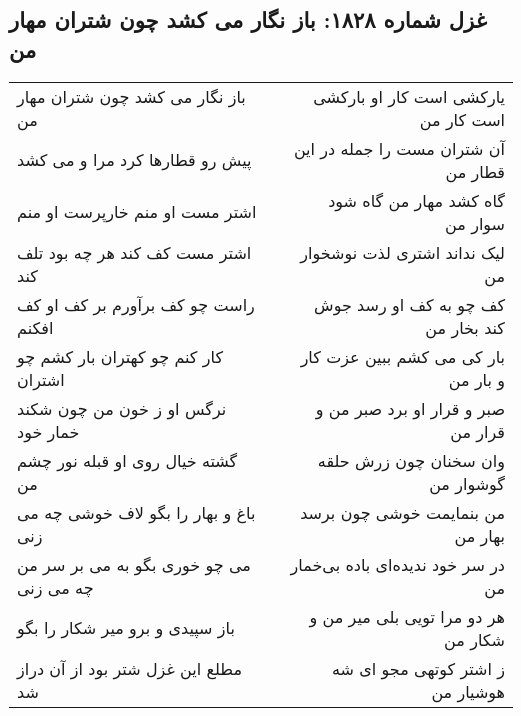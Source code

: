\begin{center}
\section*{غزل شماره ۱۸۲۸: باز نگار می کشد چون شتران مهار من}
\label{sec:1828}
\begin{longtable}{l p{0.5cm} r}
باز نگار می کشد چون شتران مهار من
&&
یارکشی است کار او بارکشی است کار من
\\
پیش رو قطارها کرد مرا و می کشد
&&
آن شتران مست را جمله در این قطار من
\\
اشتر مست او منم خارپرست او منم
&&
گاه کشد مهار من گاه شود سوار من
\\
اشتر مست کف کند هر چه بود تلف کند
&&
لیک نداند اشتری لذت نوشخوار من
\\
راست چو کف برآورم بر کف او کف افکنم
&&
کف چو به کف او رسد جوش کند بخار من
\\
کار کنم چو کهتران بار کشم چو اشتران
&&
بار کی می کشم ببین عزت کار و بار من
\\
نرگس او ز خون من چون شکند خمار خود
&&
صبر و قرار او برد صبر من و قرار من
\\
گشته خیال روی او قبله نور چشم من
&&
وان سخنان چون زرش حلقه گوشوار من
\\
باغ و بهار را بگو لاف خوشی چه می زنی
&&
من بنمایمت خوشی چون برسد بهار من
\\
می چو خوری بگو به می بر سر من چه می زنی
&&
در سر خود ندیده‌ای باده بی‌خمار من
\\
باز سپیدی و برو میر شکار را بگو
&&
هر دو مرا تویی بلی میر من و شکار من
\\
مطلع این غزل شتر بود از آن دراز شد
&&
ز اشتر کوتهی مجو ای شه هوشیار من
\\
\end{longtable}
\end{center}
